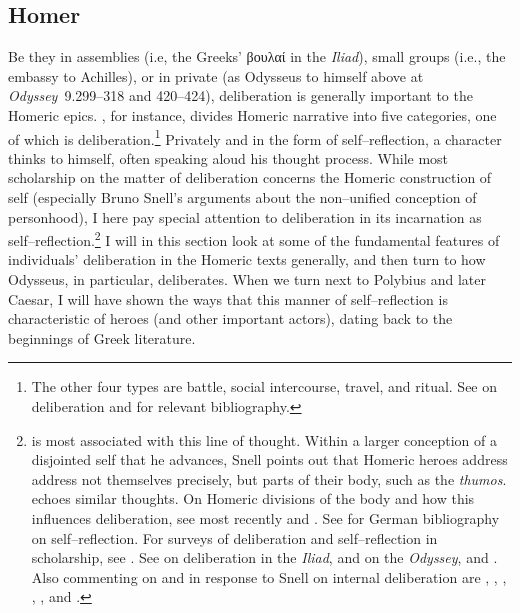 \documentclass[12pt,letterpaper,oneside,final]{memoir}
\begin{document}
\subsection{Homer}
\label{hom-comm}
Be they in assemblies (i.e, the Greeks' \textgreek{βουλαί} in the \emph{Iliad}), small groups (i.e., the embassy to Achilles), or in private (as Odysseus to himself above at \emph{Odyssey}~9.299--318 and 420--424), deliberation is generally important to the Homeric epics. \textcite{edwards1992}, for instance, divides Homeric narrative into five categories, one of which is deliberation.\footnote{The other four types are battle, social intercourse, travel, and ritual. See \textcite[316--319]{edwards1992} on deliberation and for relevant bibliography.} Privately and in the form of self--reflection, a character thinks to himself, often speaking aloud his thought process. While most scholarship on the matter of deliberation concerns the Homeric construction of self (especially Bruno Snell's arguments about the non--unified conception of personhood), I here pay special attention to deliberation in its incarnation as self--reflection.\footnote{\textcite{snell1953} is most associated with this line of thought. Within a larger conception of a disjointed self that he advances, Snell points out that Homeric heroes address address not themselves precisely, but parts of their body, such as the \emph{thumos}. \textcite[5]{dodds1951} echoes similar thoughts. On Homeric divisions of the body and how this influences deliberation, see most recently \textcite{gill1996} and \textcite[pp.~149--176, with bibliography pp.~161--162 and 175--176]{barnouw2004}. See \textcite[105]{janko1992} for German bibliography on self--reflection. For surveys of deliberation and self--reflection in scholarship, see \textcite[317--318]{edwards1992}. See \textcite{fenik1978} on deliberation in the \emph{Iliad}, and on the \emph{Odyssey}, \textcite[pp.~30, 35, 45, 53, 67, and 92]{heubeck1989} and \textcite[pp.~30, 108, 110, and 387--88]{russo1992}. Also commenting on and in response to Snell on internal deliberation are \textcite[487]{russosimon1968}, \textcite{fenik1978}, \textcite[5]{russo1982}, \textcite{jarratt1991}, \textcite[10--11]{nienkamp2001}, and \textcite[21--56]{stefanson2004}.} I will in this section look at some of the fundamental features of individuals' deliberation in the Homeric texts generally, and then turn to how Odysseus, in particular, deliberates. When we turn next to Polybius and later Caesar, I will have shown the ways that this manner of self--reflection is characteristic of heroes (and other important actors), dating back to the beginnings of Greek literature.
\end{document}
